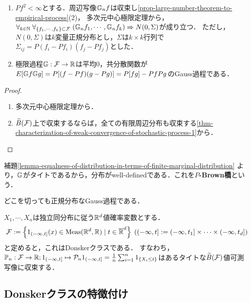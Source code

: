 \documentclass[uplatex,dvipdfmx]{jsreport}
\begin{document}
\begin{proposition}[多次元中心極限定理]\mbox{}\label{prop-multivariable-CLT}
    \begin{enumerate}
        \item $Pf^2<\infty$とする．周辺写像$\mathbb{G}_nf$は収束し\ref{prop-large-number-theorem-to-empirical-process}(2)，
        多次元中心極限定理から，$\forall_{k\in\mathbb{N}}\;\forall_{\{f_1,\cdots,f_k\}\subset\mathcal{F}}\;(\mathbb{G}_nf_1,\cdots,\mathbb{G}_nf_k)\Rightarrow N(0,\Sigma)$が成り立つ．
        ただし，$N(0,\Sigma)$は$k$変量正規分布とし，$\Sigma$は$k\times k$行列で$\Sigma_{ij}=P(f_i-Pf_i)(f_j-Pf_j)$とした．
        \item 極限過程$\mathbb{G}:\mathcal{F}\to\mathbb{R}$は平均$0$，共分散関数が$E[\mathbb{G} f\mathbb{G} g]=P[(f-Pf)(g-Pg)]=P[fg]-PfPg$のGauss過程である．
    \end{enumerate}
\end{proposition}
\begin{proof}\mbox{}
    \begin{enumerate}
        \item 多次元中心極限定理から．
        \item $\widetilde{B}(\mathcal{F})$上で収束するならば，全ての有限周辺分布も収束する\ref{thm-characterization-of-weak-convergence-of-stochastic-process-1}から．
    \end{enumerate}
\end{proof}

\begin{definition}
    補題\ref{lemma-equalness-of-distribution-in-terms-of-finite-marginal-distribution}
    より，$\mathbb{G}$がタイトであるから，分布がwell-definedである．これを\textbf{$P$-Brown橋}という．
\end{definition}
\begin{remarks}
    どこを切っても正規分布なGauss過程である．
\end{remarks}

\begin{example}[Donskerの結果]
    $X_1,\cdots,X_n$は独立同分布に従う$\mathbb{R}^d$値確率変数とする．
    \[\mathcal{F}:=\left\{1_{(-\infty,t]}(x)\in\mathrm{Meas}(\mathbb{R}^d,\mathbb{R})\mid t\in\overline{\mathbb{R}}^d\right\}\;((-\infty,t]:=(-\infty,t_1]\times\cdots\times(-\infty,t_d])\]
    と定めると，これはDonskerクラスである．
    すなわち，$\mathbb{P}_n:\mathcal{F}\to\mathbb{R};1_{(-\infty,t]}\mapsto\mathcal{P}_n1_{(-\infty,t]}=\frac{1}{n}\sum^n_{i=1}1_{\left\{X_i\le t\right\}}$はあるタイトな$\widetilde{B}(\mathcal{F})$値可測写像に収束する．
\end{example}

\subsection{Donskerクラスの特徴付け}
\end{document}
